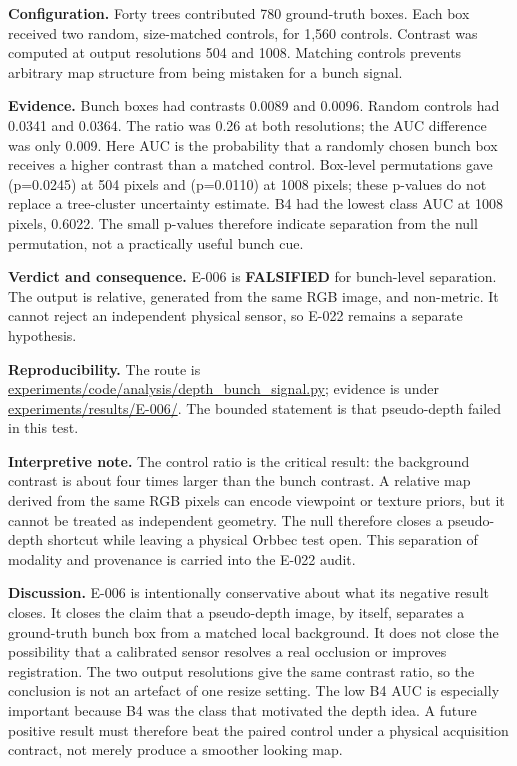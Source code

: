 \documentclass[preprint,12pt]{elsarticle}
\newcommand{\pathcode}[1]{\scriptsize\url{#1}}
\begin{document}
\textbf{Configuration.} Forty trees contributed 780 ground-truth boxes. Each
box received two random, size-matched controls, for 1,560 controls. Contrast
was computed at output resolutions 504 and 1008. Matching controls prevents
arbitrary map structure from being mistaken for a bunch signal.

\textbf{Evidence.} Bunch boxes had contrasts 0.0089 and 0.0096. Random controls
had 0.0341 and 0.0364. The ratio was 0.26 at both resolutions; the AUC
difference was only 0.009. Here AUC is the probability that a randomly chosen
bunch box receives a higher contrast than a matched control. Box-level
permutations gave (p=0.0245) at 504 pixels and (p=0.0110) at 1008 pixels;
these p-values do not replace a tree-cluster uncertainty estimate. B4 had the
lowest class AUC at 1008 pixels, 0.6022. The small p-values therefore indicate
separation from the null permutation, not a practically useful bunch cue.

\textbf{Verdict and consequence.} E-006 is \textbf{FALSIFIED} for bunch-level
separation. The output is relative, generated from the same RGB image, and
non-metric. It cannot reject an independent physical sensor, so E-022 remains
a separate hypothesis.

\textbf{Reproducibility.} The route is
\pathcode{experiments/code/analysis/depth_bunch_signal.py}; evidence is
under \pathcode{experiments/results/E-006/}. The bounded statement is
that pseudo-depth failed in this test.

\textbf{Interpretive note.} The control ratio is the critical result: the
background contrast is about four times larger than the bunch contrast. A
relative map derived from the same RGB pixels can encode viewpoint or texture
priors, but it cannot be treated as independent geometry. The null therefore
closes a pseudo-depth shortcut while leaving a physical Orbbec test open.
This separation of modality and provenance is carried into the E-022 audit.

\textbf{Discussion.} E-006 is intentionally conservative about what its
negative result closes. It closes the claim that a pseudo-depth image, by
itself, separates a ground-truth bunch box from a matched local background. It
does not close the possibility that a calibrated sensor resolves a real
occlusion or improves registration. The two output resolutions give the same
contrast ratio, so the conclusion is not an artefact of one resize setting.
The low B4 AUC is especially important because B4 was the class that motivated
the depth idea. A future positive result must therefore beat the paired
control under a physical acquisition contract, not merely produce a smoother
looking map.
\end{document}
